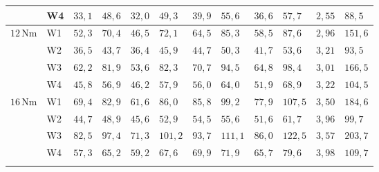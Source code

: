 \begin{table}[htbp]
\begin{tabular}{L{1.0cm}L{0.8cm}L{1.0cm}L{1.0cm}L{1.0cm}L{1.1cm}L{1.0cm}L{1.0cm}L{1.0cm}L{1.1cm}L{1.1cm}L{1.1cm}}
		\hline
		         & W4    & $33{,}1$                & $48{,}6$                & $32{,}0$                & $49{,}3$                  & $39{,}9$                  & $55{,}6$                  & $36{,}6$                  & $57{,}7$                    & $2{,}55$                 & $88{,}5$           \\
		\hline
		$12$\,Nm & W1    & $52{,}3$                & $70{,}4$                & $46{,}5$                & $72{,}1$                  & $64{,}5$                  & $85{,}3$                  & $58{,}5$                  & $87{,}6$                    & $2{,}96$                 & $151{,}6$          \\
		\hline
		         & W2    & $36{,}5$                & $43{,}7$                & $36{,}4$                & $45{,}9$                  & $44{,}7$                  & $50{,}3$                  & $41{,}7$                  & $53{,}6$                    & $3{,}21$                 & $93{,}5$           \\
		\hline
		         & W3    & $62{,}2$                & $81{,}9$                & $53{,}6$                & $82{,}3$                  & $70{,}7$                  & $94{,}5$                  & $64{,}8$                  & $98{,}4$                    & $3{,}01$                 & $166{,}5$          \\
		\hline
		         & W4    & $45{,}8$                & $56{,}9$                & $46{,}2$                & $57{,}9$                  & $56{,}0$                  & $64{,}0$                  & $51{,}9$                  & $68{,}9$                    & $3{,}22$                 & $104{,}5$          \\
		\hline
		$16$\,Nm & W1    & $69{,}4$                & $82{,}9$                & $61{,}6$                & $86{,}0$                  & $85{,}8$                  & $99{,}2$                  & $77{,}9$                  & $107{,}5$                   & $3{,}50$                 & $184{,}6$          \\
		\hline
		         & W2    & $44{,}7$                & $48{,}9$                & $45{,}6$                & $52{,}9$                  & $54{,}5$                  & $55{,}6$                  & $51{,}6$                  & $61{,}7$                    & $3{,}96$                 & $99{,}7$           \\
		\hline
		         & W3    & $82{,}5$                & $97{,}4$                & $71{,}3$                & $101{,}2$                 & $93{,}7$                  & $111{,}1$                 & $86{,}0$                  & $122{,}5$                   & $3{,}57$                 & $203{,}7$          \\
		\hline
		         & W4    & $57{,}3$                & $65{,}2$                & $59{,}2$                & $67{,}6$                  & $69{,}9$                  & $71{,}9$                  & $65{,}7$                  & $79{,}6$                    & $3{,}98$                 & $109{,}7$          \\
		\hline
	\end{tabular}
\end{table}

